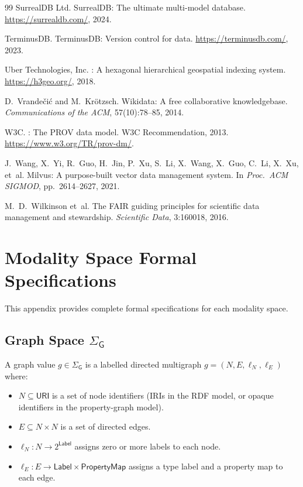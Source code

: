 \documentclass[11pt,twocolumn]{article}
\begin{document}
\begin{thebibliography}{99}
SurrealDB Ltd.
\newblock SurrealDB: The ultimate multi-model database.
\newblock \url{https://surrealdb.com/}, 2024.

TerminusDB.
\newblock TerminusDB: Version control for data.
\newblock \url{https://terminusdb.com/}, 2023.

Uber Technologies, Inc.
: A hexagonal hierarchical geospatial indexing system.
\newblock \url{https://h3geo.org/}, 2018.

D.~Vrande\v{c}i\'{c} and M.~Kr\"{o}tzsch.
\newblock Wikidata: A free collaborative knowledgebase.
\newblock \emph{Communications of the ACM}, 57(10):78--85, 2014.

{W3C}.
: The {PROV} data model.
\newblock W3C Recommendation, 2013.
\newblock \url{https://www.w3.org/TR/prov-dm/}.

J.~Wang, X.~Yi, R.~Guo, H.~Jin, P.~Xu, S.~Li, X.~Wang, X.~Guo, C.~Li,
  X.~Xu, et~al.
\newblock Milvus: A purpose-built vector data management system.
\newblock In \emph{Proc.\ ACM SIGMOD}, pp.\ 2614--2627, 2021.

M.~D.~Wilkinson et~al.
\newblock The {FAIR} guiding principles for scientific data management and
  stewardship.
\newblock \emph{Scientific Data}, 3:160018, 2016.

\end{thebibliography}

\appendix

\section{Modality Space Formal Specifications}\label{app:modality-spaces}

This appendix provides complete formal specifications for each modality space.

\subsection{Graph Space $\Sigma_\mathsf{G}$}

A graph value $g \in \Sigma_\mathsf{G}$ is a labelled directed multigraph
$g = (N, E, \ell_N, \ell_E)$ where:
\begin{itemize}[leftmargin=*]
  \item $N \subseteq \mathsf{URI}$ is a set of node identifiers (IRIs in the
    RDF model, or opaque identifiers in the property-graph model).
  \item $E \subseteq N \times N$ is a set of directed edges.
  \item $\ell_N : N \to 2^{\mathsf{Label}}$ assigns zero or more labels to
    each node.
  \item $\ell_E : E \to \mathsf{Label} \times \mathsf{PropertyMap}$ assigns
    a type label and a property map to each edge.
\end{itemize}
\end{document}
